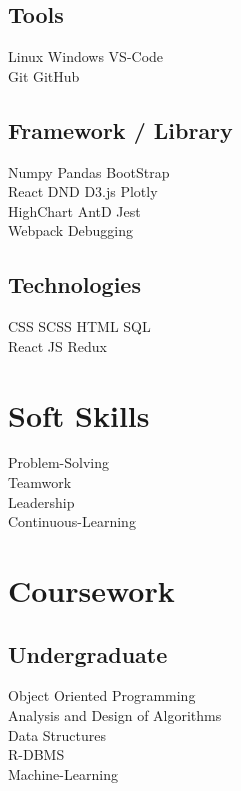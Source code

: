 \documentclass[]{deedy-resume-openfont}
\begin{document}
\begin{minipage}[t]{0.33\textwidth}
\subsection{Tools}
Linux \textbullet{} Windows \textbullet{} VS-Code \\
Git \textbullet{} GitHub
\sectionsep

\subsection{Framework / Library}
Numpy \textbullet{} Pandas \textbullet{} BootStrap \\
React DND \textbullet{} D3.js \textbullet{} Plotly \\
HighChart \textbullet{} AntD \textbullet{} Jest \\
Webpack \textbullet{} Debugging
\sectionsep

\subsection{Technologies}
CSS \textbullet{} SCSS \textbullet{} HTML \textbullet{} SQL \\
React JS \textbullet{} Redux
\sectionsep

\section{Soft Skills}
Problem-Solving \\
Teamwork \\
Leadership \\
Continuous-Learning
\sectionsep

\section{Coursework}
\subsection{Undergraduate}
Object Oriented Programming \\
Analysis and Design of Algorithms \\
Data Structures \\
R-DBMS \\
Machine-Learning
\sectionsep

\end{minipage}
\end{document}
